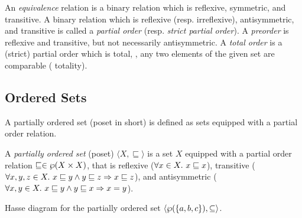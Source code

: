 An \emph{equivalence} relation is a binary relation which is reflexive, symmetric, and transitive. A binary relation which is reflexive (resp. irreflexive), antisymmetric, and transitive is called a \emph{partial order} (resp. \emph{strict partial order}). A \emph{preorder} is reflexive and transitive, but not necessarily antisymmetric. A \emph{total order} is a (strict) partial order which is total, \ie, any two elements of the given set are comparable (\cf{} totality).




\subsection{Ordered Sets}

A partially ordered set (poset in short) is defined as sets equipped with a partial order relation.

\begin{definition}
  A \emph{partially ordered set} (poset) $\langle X, \sqsubseteq \rangle$ is a set $X$ equipped with a partial order relation $\sqsubseteq\in\wp(X\times X)$, that is reflexive ($\forall x \in X.~ x \sqsubseteq x$), transitive ($\forall x, y, z \in X.~ x \sqsubseteq y \land y \sqsubseteq z \Rightarrow x \sqsubseteq z$), and antisymmetric ($\forall x, y \in X.~ x \sqsubseteq y \land y \sqsubseteq x \Rightarrow x = y$).
\end{definition}

\begin{marginfigure}
  \centering
  \caption{Hasse diagram for the partially ordered set $\langle \wp(\{a, b, c\}), \subseteq \rangle$.}
  \end{marginfigure}

